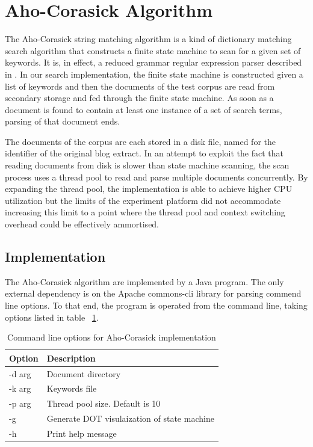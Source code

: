 \documentclass[10pt]{report}
\begin{document}
\section{Aho-Corasick Algorithm}
\label{sec:ahocorasickalgorithm}
The Aho-Corasick string matching algorithm\cite{RefWorks:103} is a
kind of dictionary matching search algorithm that constructs a finite
state machine to scan for a given set of keywords. It is, in effect, a
reduced grammar regular expression parser described in
\cite{RefWorks:111}. In our search implementation, the finite state
machine is constructed given a list of keywords and then the documents
of the test corpus are read from secondary storage and fed through the
finite state machine. As soon as a document is found to contain at
least one instance of a set of search terms, parsing of that document
ends.

The documents of the corpus are each stored in a disk file, named for
the identifier of the original blog extract. In an attempt to exploit
the fact that reading documents from disk is slower than
state machine scanning, the scan process uses a thread pool to read
and parse multiple documents concurrently. By expanding the thread
pool, the implementation is able to achieve higher CPU utilization but
the limits of the experiment platform did not accommodate increasing
this limit to a point where the thread pool and context switching
overhead could be effectively ammortised.


\subsection*{Implementation}
The Aho-Corasick algorithm are implemented by a Java
program. The only external dependency is on the Apache commons-cli
library for parsing commend line options. To that end, the program is
operated from the command line, taking options listed in table
~\ref{tab:ahocommandline}.  
\\
\begin{table}[h]
  \centering
  \begin{tabular}{ |l|p{10cm}|} 
    \hline
    Option & Description \\ \hline
    -d \<arg\>  &  Document directory \\ \hline
    -k \<arg\>  &  Keywords file \\ \hline
    -p \<arg\>  &  Thread pool size. Default is 10 \\ \hline
    -g          &  Generate DOT visulaization of state machine \\ \hline
    -h          &  Print help message \\ \hline
  \end{tabular}
  \caption{Command line options for Aho-Corasick implementation}
  \label{tab:ahocommandline}
\end{table}
\\
\end{document}
